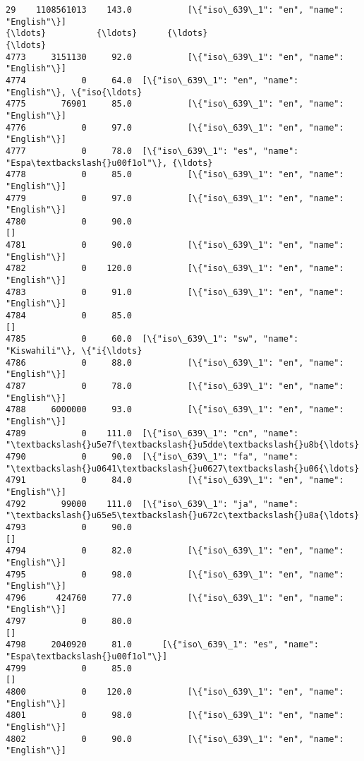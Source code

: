 \documentclass[11pt]{article}
\begin{document}
\begin{Verbatim}[commandchars=\\\{\}]
29    1108561013    143.0           [\{"iso\_639\_1": "en", "name": "English"\}]   
{\ldots}          {\ldots}      {\ldots}                                                {\ldots}   
4773     3151130     92.0           [\{"iso\_639\_1": "en", "name": "English"\}]   
4774           0     64.0  [\{"iso\_639\_1": "en", "name": "English"\}, \{"iso{\ldots}   
4775       76901     85.0           [\{"iso\_639\_1": "en", "name": "English"\}]   
4776           0     97.0           [\{"iso\_639\_1": "en", "name": "English"\}]   
4777           0     78.0  [\{"iso\_639\_1": "es", "name": "Espa\textbackslash{}u00f1ol"\}, {\ldots}   
4778           0     85.0           [\{"iso\_639\_1": "en", "name": "English"\}]   
4779           0     97.0           [\{"iso\_639\_1": "en", "name": "English"\}]   
4780           0     90.0                                                 []   
4781           0     90.0           [\{"iso\_639\_1": "en", "name": "English"\}]   
4782           0    120.0           [\{"iso\_639\_1": "en", "name": "English"\}]   
4783           0     91.0           [\{"iso\_639\_1": "en", "name": "English"\}]   
4784           0     85.0                                                 []   
4785           0     60.0  [\{"iso\_639\_1": "sw", "name": "Kiswahili"\}, \{"i{\ldots}   
4786           0     88.0           [\{"iso\_639\_1": "en", "name": "English"\}]   
4787           0     78.0           [\{"iso\_639\_1": "en", "name": "English"\}]   
4788     6000000     93.0           [\{"iso\_639\_1": "en", "name": "English"\}]   
4789           0    111.0  [\{"iso\_639\_1": "cn", "name": "\textbackslash{}u5e7f\textbackslash{}u5dde\textbackslash{}u8b{\ldots}   
4790           0     90.0  [\{"iso\_639\_1": "fa", "name": "\textbackslash{}u0641\textbackslash{}u0627\textbackslash{}u06{\ldots}   
4791           0     84.0           [\{"iso\_639\_1": "en", "name": "English"\}]   
4792       99000    111.0  [\{"iso\_639\_1": "ja", "name": "\textbackslash{}u65e5\textbackslash{}u672c\textbackslash{}u8a{\ldots}   
4793           0     90.0                                                 []   
4794           0     82.0           [\{"iso\_639\_1": "en", "name": "English"\}]   
4795           0     98.0           [\{"iso\_639\_1": "en", "name": "English"\}]   
4796      424760     77.0           [\{"iso\_639\_1": "en", "name": "English"\}]   
4797           0     80.0                                                 []   
4798     2040920     81.0      [\{"iso\_639\_1": "es", "name": "Espa\textbackslash{}u00f1ol"\}]   
4799           0     85.0                                                 []   
4800           0    120.0           [\{"iso\_639\_1": "en", "name": "English"\}]   
4801           0     98.0           [\{"iso\_639\_1": "en", "name": "English"\}]   
4802           0     90.0           [\{"iso\_639\_1": "en", "name": "English"\}]   


\end{Verbatim}
\end{document}
